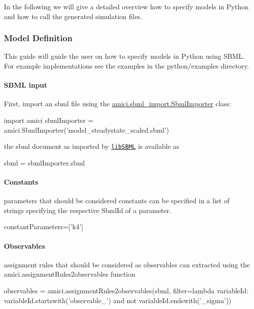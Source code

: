 In the following we will give a detailed overview how to specify models in Python and how to call the generated simulation files.

\subsubsection*{Model Definition}

This guide will guide the user on how to specify models in Python using S\+B\+ML. For example implementations see the examples in the python/examples directory.

\paragraph*{S\+B\+ML input}

First, import an sbml file using the {\ttfamily \mbox{\hyperlink{classamici_1_1sbml__import_1_1_sbml_importer}{amici.\+sbml\+\_\+import.\+Sbml\+Importer}}} class\+: \begin{DoxyVerb}import amici
sbmlImporter = amici.SbmlImporter('model_steadystate_scaled.sbml')
\end{DoxyVerb}


the sbml document as imported by \href{http://sbml.org/Software/libSBML}{\tt lib\+S\+B\+ML} is available as \begin{DoxyVerb}sbml = sbmlImporter.sbml
\end{DoxyVerb}


\paragraph*{Constants}

parameters that should be considered constants can be specified in a list of strings specifying the respective Sbml\+Id of a parameter. \begin{DoxyVerb}constantParameters=['k4']
\end{DoxyVerb}


\paragraph*{Observables}

assignment rules that should be considered as observables can extracted using the {\ttfamily amici.\+assignment\+Rules2observables} function \begin{DoxyVerb}observables = amici.assignmentRules2observables(sbml, filter=lambda variableId: 
                                                variableId.startswith('observable_') and not variableId.endswith('_sigma'))
\end{DoxyVerb}


